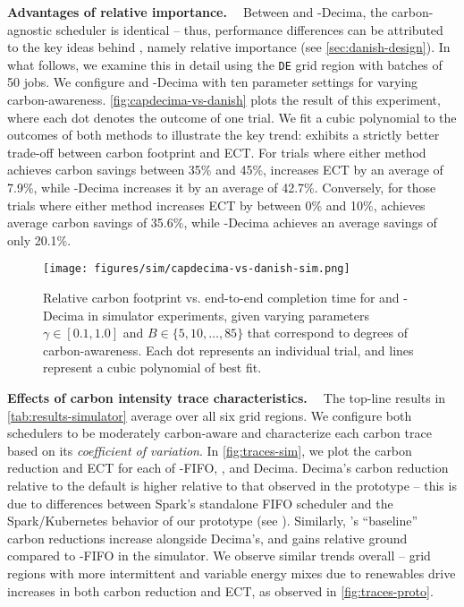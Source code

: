 \noindent \textbf{Advantages of relative importance. \ }
Between \DANISH and \CAP-Decima, the carbon-agnostic scheduler is identical -- thus, performance differences can be attributed to the key ideas behind \DANISH, namely relative importance (see \autoref{sec:danish-design}).  In what follows, we examine this in detail using the \verb|DE| grid region with batches of 50 jobs.  We configure \DANISH and \CAP-Decima with ten parameter settings for varying carbon-awareness.  \autoref{fig:capdecima-vs-danish} plots the result of this experiment, where each dot denotes the outcome of one trial.  We fit a cubic polynomial to the outcomes of both methods to illustrate the key trend: \DANISH exhibits a strictly better trade-off between carbon footprint and ECT.  For trials where either method achieves carbon savings between 35\% and 45\%, \DANISH increases ECT by an average of 7.9\%, while \CAP-Decima increases it by an average of 42.7\%.  Conversely, for those trials where either method increases ECT by between 0\% and 10\%, \DANISH achieves average carbon savings of 35.6\%, while \CAP-Decima achieves an average savings of only 20.1\%.

\begin{figure}[t]
    \centering 
    \texttt{[image: figures/sim/capdecima-vs-danish-sim.png]} \vspace{-1em}
    \caption{ Relative carbon footprint %
    vs. end-to-end completion time %
    for \DANISH and \CAP-Decima in simulator experiments, given varying parameters $\gamma \in [0.1, 1.0]$ and $B \in \{ 5, 10, \dots , 85\}$ that correspond to degrees of carbon-awareness.  Each dot represents an individual trial, and lines represent a cubic polynomial of best fit. } %
    \label{fig:capdecima-vs-danish} \vspace{-0.6cm}
\end{figure}


\noindent \textbf{Effects of carbon intensity trace characteristics. \ } The top-line results in \autoref{tab:results-simulator} average over all six grid regions.  
We configure both schedulers to be moderately carbon-aware and characterize each carbon trace based on its \textit{coefficient of variation}. In \autoref{fig:traces-sim}, we plot the carbon reduction and ECT for each of \CAP-FIFO, \DANISH, and Decima.  
Decima's carbon reduction relative to the 
default is higher relative to that observed in the prototype -- this is due to differences between Spark's standalone FIFO scheduler and the Spark/Kubernetes behavior of our prototype (see ).  Similarly, \DANISH's ``baseline'' carbon reductions increase alongside Decima's, and \CAP gains relative ground compared to \CAP-FIFO in the simulator.
We observe similar trends overall -- grid regions with more intermittent and variable energy mixes due to renewables drive increases in both carbon reduction and ECT, as observed in \autoref{fig:traces-proto}.

